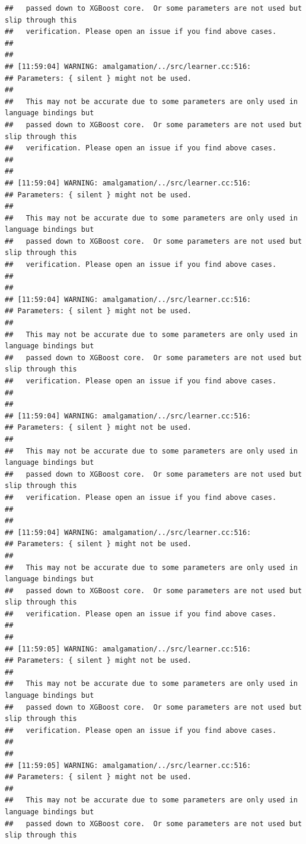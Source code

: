 \documentclass[AMS,STIX2COL]{WileyNJD-v2}\usepackage[]{graphicx}\usepackage[]{color}
\makeatletter
\newenvironment{kframe}{%
 \def\at@end@of@kframe{}%
 \ifinner\ifhmode%
  \def\at@end@of@kframe{\end{minipage}}%
  \begin{minipage}{\columnwidth}%
 \fi\fi%
 \def\FrameCommand##1{\hskip\@totalleftmargin \hskip-\fboxsep
 \colorbox{shadecolor}{##1}\hskip-\fboxsep
     \hskip-\linewidth \hskip-\@totalleftmargin \hskip\columnwidth}%
 \MakeFramed {\advance\hsize-\width
   \@totalleftmargin\z@ \linewidth\hsize
   \@setminipage}}%
 {\par\unskip\endMakeFramed%
 \at@end@of@kframe}
\newenvironment{knitrout}{}{} %
\makeatother
\begin{document}
\begin{knitrout}
\begin{kframe}
\begin{verbatim}
##   passed down to XGBoost core.  Or some parameters are not used but slip through this
##   verification. Please open an issue if you find above cases.
## 
## 
## [11:59:04] WARNING: amalgamation/../src/learner.cc:516: 
## Parameters: { silent } might not be used.
## 
##   This may not be accurate due to some parameters are only used in language bindings but
##   passed down to XGBoost core.  Or some parameters are not used but slip through this
##   verification. Please open an issue if you find above cases.
## 
## 
## [11:59:04] WARNING: amalgamation/../src/learner.cc:516: 
## Parameters: { silent } might not be used.
## 
##   This may not be accurate due to some parameters are only used in language bindings but
##   passed down to XGBoost core.  Or some parameters are not used but slip through this
##   verification. Please open an issue if you find above cases.
## 
## 
## [11:59:04] WARNING: amalgamation/../src/learner.cc:516: 
## Parameters: { silent } might not be used.
## 
##   This may not be accurate due to some parameters are only used in language bindings but
##   passed down to XGBoost core.  Or some parameters are not used but slip through this
##   verification. Please open an issue if you find above cases.
## 
## 
## [11:59:04] WARNING: amalgamation/../src/learner.cc:516: 
## Parameters: { silent } might not be used.
## 
##   This may not be accurate due to some parameters are only used in language bindings but
##   passed down to XGBoost core.  Or some parameters are not used but slip through this
##   verification. Please open an issue if you find above cases.
## 
## 
## [11:59:04] WARNING: amalgamation/../src/learner.cc:516: 
## Parameters: { silent } might not be used.
## 
##   This may not be accurate due to some parameters are only used in language bindings but
##   passed down to XGBoost core.  Or some parameters are not used but slip through this
##   verification. Please open an issue if you find above cases.
## 
## 
## [11:59:05] WARNING: amalgamation/../src/learner.cc:516: 
## Parameters: { silent } might not be used.
## 
##   This may not be accurate due to some parameters are only used in language bindings but
##   passed down to XGBoost core.  Or some parameters are not used but slip through this
##   verification. Please open an issue if you find above cases.
## 
## 
## [11:59:05] WARNING: amalgamation/../src/learner.cc:516: 
## Parameters: { silent } might not be used.
## 
##   This may not be accurate due to some parameters are only used in language bindings but
##   passed down to XGBoost core.  Or some parameters are not used but slip through this

\end{verbatim}
\end{kframe}
\end{knitrout}
\end{document}
